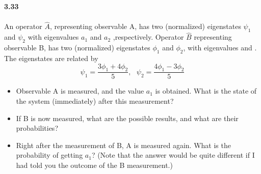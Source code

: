 \documentclass[fleqn]{article}
\begin{document}
  \textbf{3.33} \\ \\
  An operator $\hat{A}$, representing observable
  A, has two (normalized) eigenstates $\psi_1$ and $\psi_2$ with eigenvalues $a_1$ and $a_2$
  ,respectively. Operator $\hat{B}$ representing observable B, has two (normalized)
  eigenstates $\phi_1$ and $\phi_2$, with eigenvalues and . The eigenstates are related
  by
  $$\psi_1=\dfrac{3\phi_1+4\phi_2}{5}, ~~~ \psi_2=\dfrac{4\phi_1-3\phi_2}{5}$$
  \begin{itemize}
    \item Observable A is measured, and the value $a_1$ is obtained. What is the state
    of the system (immediately) after this measurement?

    \item If B is now measured, what are the possible results, and what are their
    probabilities?
    
    \item Right after the measurement of B, A is measured again. What is the
    probability of getting $a_1$? (Note that the answer would be quite different if
    I had told you the outcome of the B measurement.)
    
  \end{itemize}
\end{document}
